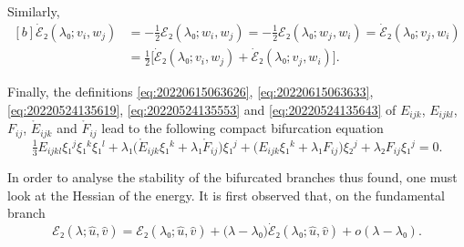 \documentclass[12pt, final]{scrartcl}
\theoremstyle{definition}
\begin{document}
Similarly,
\begin{equation*}
  \begin{aligned}[b]
    \dot{ℰ}₂(λ₀; v_i, w_j) &= - \tfrac{1}{2} ℰ₂(λ₀; w_i, w_j) = - \tfrac{1}{2} ℰ₂(λ₀; w_j, w_i) = \dot{ℰ}₂(λ₀; v_j, w_i)\\
                           &= \tfrac{1}{2} \bigl[ \dot{ℰ}₂(λ₀; v_i, w_j) + \dot{ℰ}₂(λ₀; v_j, w_i) \bigr].
  \end{aligned}
\end{equation*}

Finally, the definitions \eqref{eq:20220615063626}, \eqref{eq:20220615063633},
\eqref{eq:20220524135619}, \eqref{eq:20220524135553} and
\eqref{eq:20220524135643} of \(E_{ijk}\), \(E_{ijkl}\), \(F_{ij}\),
\(\mathring{E}_{ijk}\) and \(\mathring{F}_{ij}\) lead to the following compact
bifurcation equation
\begin{equation}
  \label{eq:20220601070917}
  \tfrac{1}{3} E_{ijkl} ξ₁^j ξ₁^k ξ₁^l + λ₁ \bigl( \mathring{E}_{ijk} ξ₁^k + λ₁ \mathring{F}_{ij} \bigr)ξ₁^j + \bigl(E_{ijk} ξ₁^k + λ₁ F_{ij}\bigr) ξ₂^j + λ₂ F_{ij} ξ₁^j = 0.
\end{equation}

In order to analyse the stability of the bifurcated branches thus found, one
must look at the Hessian of the energy. It is first observed that, on the
fundamental branch
\begin{equation}
 ℰ₂(λ; \hat{u}, \hat{v}) = ℰ₂(λ₀; \hat{u}, \hat{v}) + \bigl(λ - λ₀\bigr) \dot{ℰ}₂(λ₀; \hat{u}, \hat{v}) + o(λ - λ₀).
\end{equation}
\end{document}

